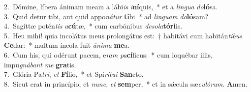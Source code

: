{2.~}Dómine, líbera ánimam meam a lábi\textit{is} \textit{i}\textbf{ní}quis,~* et a \textit{lin}\textit{gua} \textit{do}\textbf{ló}sa.\\
{3.~}Quid detur tibi, aut quid appo\textit{ná}\textit{tur} \textbf{ti}bi~* ad \textit{lin}\textit{guam} \textit{do}\textbf{ló}sam?\\
{4.~}Sagíttæ potén\textit{tis} \textit{a}\textbf{cú}tæ,~* cum carbónibus \textit{de}\textit{so}\textit{la}\textbf{tó}\textbf{ri}is.\\
{5.~}Heu mihi! quia incolátus meus prolongátus est:~† habitávi cum habitán\textit{ti}\textit{bus} \textbf{Ce}dar:~* multum íncola fuit \textit{á}\textit{ni}\textit{ma} \textbf{me}a.\\
{6.~}Cum his, qui odérunt pacem, e\textit{ram} \textit{pa}\textbf{cí}ficus:~* cum loquébar illis, impu\textit{gná}\textit{bant} \textit{me} \textbf{gra}tis.\\
{7.~}Glória Pa\textit{tri}, \textit{et} \textbf{Fí}lio,~* et Spi\textit{rí}\textit{tu}\textit{i} \textbf{San}cto.\\
{8.~}Sicut erat in princípio, et \textit{nunc}, \textit{et} \textbf{sem}per,~* et in sǽcula sæ\textit{cu}\textit{ló}\textit{rum}. \textbf{A}men.\\
